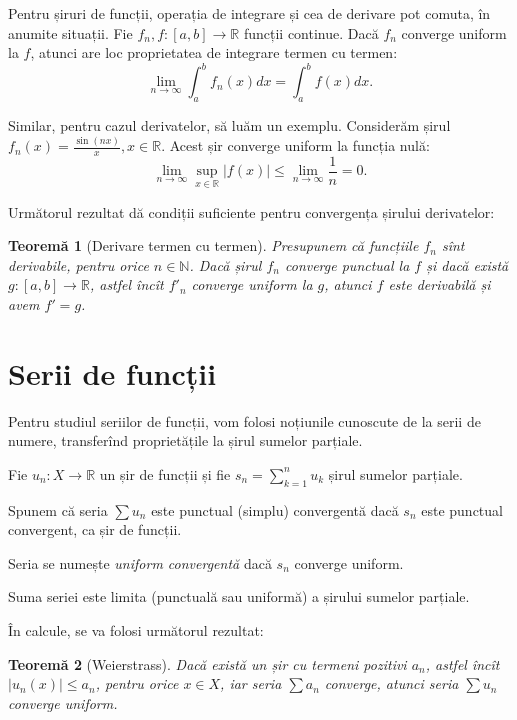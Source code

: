\documentclass[11pt,a4paper]{article}
\newcommand\ds{\displaystyle}
\newcommand\NN{\mathbb{N}}
\newcommand\RR{\mathbb{R}}
\theoremstyle{dotless}
\newtheorem{theorem}{Teorem\u{a}}[section]
\theoremstyle{dotlessdr}
\begin{document}
Pentru șiruri de funcții, operația de integrare și cea de derivare pot comuta,
în anumite situații. Fie $f_n, f : [a, b] \to \RR$ funcții continue. Dacă
$f_n$ converge uniform la $f$, atunci are loc proprietatea de integrare
termen cu termen:
\[
  \lim_{n \to \infty} \int_a^b f_n(x) dx = \int_a^b f(x) dx.
\]

Similar, pentru cazul derivatelor, să luăm un exemplu. Considerăm șirul
$f_n(x) = \frac{\sin (nx)}{x}, x \in \RR$. Acest șir converge uniform la
funcția nulă:
\[
  \lim_{n \to \infty} \sup_{x \in \RR} | f(x) | \leq \lim_{n \to \infty} \frac{1}{n} = 0.
\]

Următorul rezultat dă condiții suficiente pentru convergența șirului derivatelor:

\begin{theorem}[Derivare termen cu termen]\label{thm:derivare-termen}
  Presupunem că funcțiile $f_n$ sînt derivabile, pentru orice $n \in \NN$. Dacă
  șirul $f_n$ converge punctual la $f$ și dacă există $g: [a, b] \to \RR$,
  astfel încît $f'_n$ converge uniform la $g$, atunci $f$ este derivabilă și avem
  $f' = g$.
\end{theorem}


\section{Serii de funcții}
\label{sec:serii-f}

Pentru studiul seriilor de funcții, vom folosi noțiunile cunoscute de la serii
de numere, transferînd proprietățile la șirul sumelor parțiale.

Fie $u_n : X \to \RR$ un șir de funcții și fie $s_n = \ds\sum_{k = 1}^n u_k$ șirul
sumelor parțiale.

Spunem că seria $\sum u_n$ este punctual (simplu) convergentă dacă $s_n$ este punctual
convergent, ca șir de funcții.

Seria se numește \emph{uniform convergentă} dacă $s_n$ converge uniform.

Suma seriei este limita (punctuală sau uniformă) a șirului sumelor parțiale.

În calcule, se va folosi următorul rezultat:

\begin{theorem}[Weierstrass]\label{thm:weierstrass-uc}
  Dacă există un șir cu termeni pozitivi $a_n$, astfel încît $|u_n(x)| \leq a_n$, pentru
  orice $x \in X$, iar seria $\sum a_n$ converge, atunci seria $\sum u_n$ converge uniform.
\end{theorem}
\end{document}
